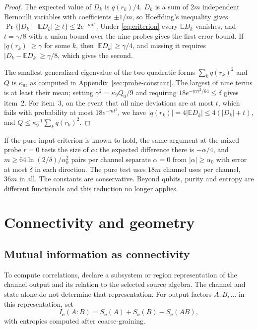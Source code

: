 \documentclass[12pt,a4paper]{article}
\begin{document}
\begin{proof}
The expected value of $D_k$ is $q(r_k)/4$. $D_k$ is a sum of $2m$ independent Bernoulli variables with coefficients $\pm1/m$, so Hoeffding's inequality \cite{Hoeffding1963} gives $\Pr\{|D_k-\mathbb ED_k|\ge t\}\le2e^{-mt^2}$. Under \eqref{eq:criterion} every $\mathbb ED_k$ vanishes, and $t=\gamma/8$ with a union bound over the nine probes gives the first error bound. If $|q(r_k)|\ge\gamma$ for some $k$, then $|\mathbb ED_k|\ge\gamma/4$, and missing it requires $|D_k-\mathbb ED_k|\ge\gamma/8$, which gives the second.

The smallest generalized eigenvalue of the two quadratic forms
$\sum_kq(r_k)^2$ and $Q$ is $\kappa_9$, as computed in
Appendix~\ref{sec:probe-constant}. The largest of nine terms is at least their mean; setting $\gamma^2=\kappa_9Q_0/9$ and requiring $18e^{-m\gamma^2/64}\le\delta$ gives item~2. For item~3, on the event that all nine deviations are at most $t$, which fails with probability at most $18e^{-mt^2}$, we have $|q(r_k)|=4|\mathbb ED_k|\le4(|D_k|+t)$, and $Q\le\kappa_9^{-1}\sum_kq(r_k)^2$.
\end{proof}

If the pure-input criterion is known to hold, the same argument at the mixed probe $r=0$ tests the size of $\alpha$: the expected difference there is $-\alpha/4$, and $m\ge64\ln(2/\delta)/\alpha_0^2$ pairs per channel separate $\alpha=0$ from $|\alpha|\ge\alpha_0$ with error at most $\delta$ in each direction. The pure test uses $18m$ channel uses per channel, $36m$ in all. The constants are conservative. Beyond qubits, purity and entropy are different functionals and this reduction no longer applies.

\section{Connectivity and geometry}
\label{sec:geometry}

\subsection{Mutual information as connectivity}

To compute correlations, declare a subsystem or region representation
of the channel output and its relation to the selected source algebra.
The channel and state alone do not determine that representation.
For output factors $A,B,\dots$ in this representation, set
\[
I_{\mathbf c}(A:B)=S_{\mathbf c}(A)+S_{\mathbf c}(B)-S_{\mathbf c}(AB),
\]
with entropies computed after coarse-graining.
\end{document}
